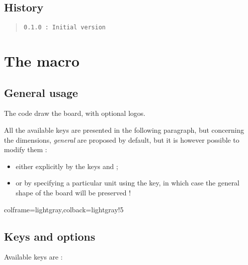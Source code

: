 \documentclass[11pt,a4paper]{ltxdoc}
\begin{document}
\vfill

\subsection{History}

\begin{quote}
\begin{verbatim}
0.1.0 : Initial version
\end{verbatim}
\end{quote}

\pagebreak

\section{The macro}

\subsection{General usage}

The code draw the board, with optional logos.

All the available keys are presented in the following paragraph, but concerning the dimensions, \textit{general} are proposed by default, but it is however possible to modify them :

\begin{itemize}
	\item either explicitly by the keys \MontreCode{[Radius=]} and \MontreCode{[BorderHeight=]};
	\item or by specifying a particular unit using the \MontreCode{[Unit=]} key, in which case the general shape of the board will be preserved !
\end{itemize}

\begin{tcblisting}{colframe=lightgray,colback=lightgray!5}
\BoardTrivialPursuit[Unit=0.5]
%
\BoardTrivialPursuit[Radius=4,BorderHeight=1.25] %

\BoardTrivialPursuit[Unit=0.33] %
\end{tcblisting}

\pagebreak

\subsection{Keys and options}

Available \textsf{keys} are :
\end{document}
